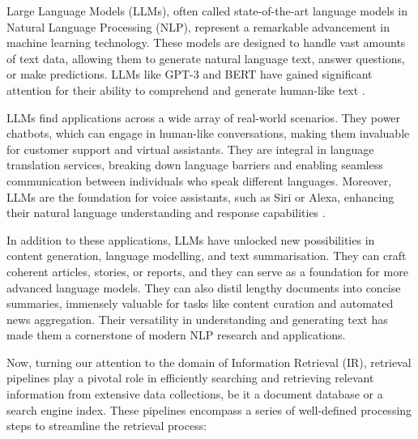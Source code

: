 Large Language Models (LLMs), often called state-of-the-art language models in Natural Language Processing (NLP), represent a remarkable advancement in machine learning technology. These models are designed to handle vast amounts of text data, allowing them to generate natural language text, answer questions, or make predictions. LLMs like GPT-3 and BERT have gained significant attention for their ability to comprehend and generate human-like text \cite{penha2022}.

LLMs find applications across a wide array of real-world scenarios. They power chatbots, which can engage in human-like conversations, making them invaluable for customer support and virtual assistants. They are integral in language translation services, breaking down language barriers and enabling seamless communication between individuals who speak different languages. Moreover, LLMs are the foundation for voice assistants, such as Siri or Alexa, enhancing their natural language understanding and response capabilities \cite{gpt}.

In addition to these applications, LLMs have unlocked new possibilities in content generation, language modelling, and text summarisation. They can craft coherent articles, stories, or reports, and they can serve as a foundation for more advanced language models. They can also distil lengthy documents into concise summaries, immensely valuable for tasks like content curation and automated news aggregation. Their versatility in understanding and generating text has made them a cornerstone of modern NLP research and applications.

Now, turning our attention to the domain of Information Retrieval (IR), retrieval pipelines play a pivotal role in efficiently searching and retrieving relevant information from extensive data collections, be it a document database or a search engine index. These pipelines encompass a series of well-defined processing steps to streamline the retrieval process:

